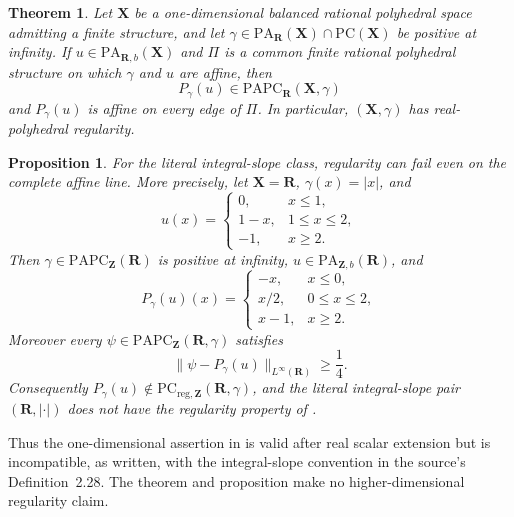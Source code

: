 \documentclass[11pt,a4paper]{article}
\newtheorem{theorem}{Theorem}[section]
\newtheorem{proposition}[proposition]{Proposition}
\theoremstyle{definition}
\theoremstyle{remark}
\begin{document}
\begin{theorem}
\label{thm:frontier-polyhedral-one-dimensional-real-regularity}
Let $\mathbf X$ be a one-dimensional balanced rational polyhedral space
admitting a finite structure, and let
$\gamma\in\mathrm{PA}_{\mathbf R}(\mathbf X)\cap
\mathrm{PC}(\mathbf X)$ be positive at infinity.  If
$u\in\mathrm{PA}_{\mathbf R,b}(\mathbf X)$ and $\Pi$ is a common finite
rational polyhedral structure on which $\gamma$ and $u$ are affine, then
\[
 P_\gamma(u)\in
 \mathrm{PAPC}_{\mathbf R}(\mathbf X,\gamma)
\]
and $P_\gamma(u)$ is affine on every edge of $\Pi$.  In particular,
$(\mathbf X,\gamma)$ has real-polyhedral regularity.
\end{theorem}

\begin{proposition}
\label{prop:frontier-polyhedral-integral-regularity-counterexample}
For the literal integral-slope class, regularity can fail even on the complete
affine line.  More precisely, let $\mathbf X=\mathbf R$,
$\gamma(x)=|x|$, and
\[
 u(x)=
 \begin{cases}
  0,&x\leq1,\\
  1-x,&1\leq x\leq2,\\
  -1,&x\geq2.
 \end{cases}
\]
Then $\gamma\in\mathrm{PAPC}_{\mathbf Z}(\mathbf R)$ is positive at infinity,
$u\in\mathrm{PA}_{\mathbf Z,b}(\mathbf R)$, and
\[
 P_\gamma(u)(x)=
 \begin{cases}
  -x,&x\leq0,\\
  x/2,&0\leq x\leq2,\\
  x-1,&x\geq2.
 \end{cases}
\]
Moreover every
$\psi\in\mathrm{PAPC}_{\mathbf Z}(\mathbf R,\gamma)$ satisfies
\[
 \lVert\psi-P_\gamma(u)\rVert_{L^\infty(\mathbf R)}\geq\frac14.
\]
Consequently
$P_\gamma(u)\notin\mathrm{PC}_{\mathrm{reg},\mathbf Z}
(\mathbf R,\gamma)$, and the literal integral-slope pair
$(\mathbf R,|\cdot|)$ does not have the regularity property of
\cite[Theorem~6.4 and Definition~6.5]{BMPS26}.
\end{proposition}

Thus the one-dimensional assertion in
\cite[Proposition~6.13]{BMPS26} is valid after real scalar extension but is
incompatible, as written, with the integral-slope convention in the source's
Definition~2.28.  The theorem and proposition make no higher-dimensional
regularity claim.
\end{document}
